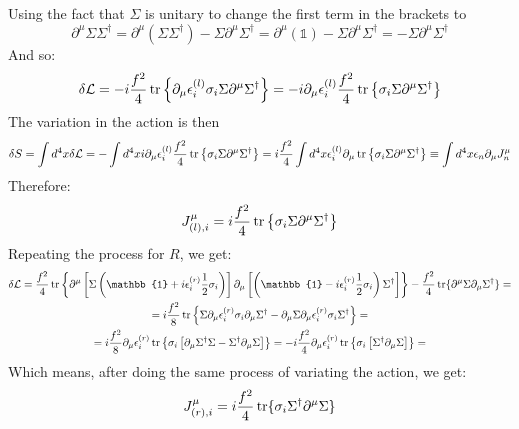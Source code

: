 \documentclass{article}
\begin{document}
Using the fact that $\Sigma$ is unitary to change the first term in the brackets to
\begin{equation}
    \partial^\mu \Sigma \Sigma^\dagger = \partial^\mu(\Sigma \Sigma^\dagger) - \Sigma\partial^\mu \Sigma^\dagger = \partial^\mu(\mathbb{1}) - \Sigma\partial^\mu \Sigma^\dagger = -\Sigma\partial^\mu \Sigma^\dagger
\end{equation}
And so:
\begin{equation}
    \delta \mathcal{L} = -i \frac{f^2}{4}\tr\left\{\partial_\mu \epsilon^{(l)}_i \sigma_i \Sigma \partial^\mu \Sigma^\dagger\right\} = -i \partial_\mu \epsilon^{(l)}_i \frac{f^2}{4}\tr\left\{\sigma_i \Sigma \partial^\mu \Sigma^\dagger\right\}
\end{equation}
The variation in the action is then
\begin{equation}
    \delta S = \int d^4 x \delta \mathcal{L} = -\int d^4 x i \partial_\mu \epsilon^{(l)}_i \frac{f^2}{4}\tr\left\{\sigma_i \Sigma \partial^\mu \Sigma^\dagger\right\} = i \frac{f^2}{4} \int d^4 x \epsilon^{(l)}_i \partial_\mu\tr\left\{\sigma_i \Sigma \partial^\mu \Sigma^\dagger\right\} \equiv \int d^4 x \epsilon_n \partial_\mu J^\mu_n
\end{equation}
Therefore:
\begin{equation}
\label{eq:left-current}
    J^\mu_{(l),i} = i\frac{f^2}{4} \tr\left\{\sigma_i \Sigma \partial^\mu \Sigma^\dagger\right\}
\end{equation}
Repeating the process for $R$, we get:
\begin{equation}
\begin{gathered}
    \delta \mathcal{L} = \frac{f^2}{4}
        \tr\left\{\partial^\mu\left[\Sigma\left(\mathbb{1} + i\epsilon^{(r)}_i \frac{1}{2}\sigma_i\right)\right] \partial_\mu\left[\left(\mathbb{1} - i\epsilon^{(r)}_i \frac{1}{2}\sigma_i\right)\Sigma^\dagger\right]\right\} - \frac{f^2}{4}\tr\{
            \partial^\mu\Sigma\partial_\mu\Sigma^\dagger
        \}
    = \\ = i \frac{f^2}{8}\tr\left\{
        \Sigma \partial_\mu \epsilon^{(r)}_i \sigma_i \partial_\mu \Sigma^\dagger - \partial_\mu \Sigma \partial_\mu \epsilon^{(r)}_i \sigma_i \Sigma^\dagger
    \right\} = \\ = i \frac{f^2}{8}\partial_\mu \epsilon^{(r)}_i\tr\left\{\sigma_i\left[
        \partial_\mu \Sigma^\dagger \Sigma -  \Sigma^\dagger \partial_\mu \Sigma\right]
    \right\} = - i \frac{f^2}{4}\partial_\mu \epsilon^{(r)}_i\tr\left\{\sigma_i\left[\Sigma^\dagger \partial_\mu \Sigma\right]
    \right\} = 
\end{gathered}
\end{equation}
Which means, after doing the same process of variating the action, we get:
\begin{equation}
\label{eq:right-current}
    J^\mu_{(r),i} = i\frac{f^2}{4}\tr\{\sigma_i\Sigma^\dagger\partial^\mu\Sigma\}
\end{equation}
\end{document}
